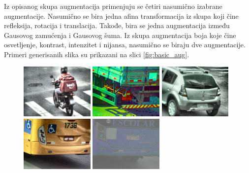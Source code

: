 \documentclass[12pt,oneside]{memoir}
\begin{document}
\noindent Iz opisanog skupa augmentacija primenjuju se četiri nasumično izabrane augmentacije. Nasumično se bira jedna afina transformacija iz skupa koji čine refleksija, rotacija i translacija. Takođe, bira se jedna augmentacija između Gausovog zamućenja i Gausovog šuma. Iz skupa augmentacija boja koje čine osvetljenje, kontrast, intenzitet i nijansa, nasumično se biraju dve augmentacije. Primeri generisanih slika su prikazani na slici \ref{fig:basic_aug}.

\begin{figure}[!htbp]
\centering
  \includegraphics[width=0.32\textwidth]{matfmaster/glava4/basic_aug/1.jpg}
  \includegraphics[width=0.32\textwidth]{matfmaster/glava4/basic_aug/2.jpg}
  \includegraphics[width=0.32\textwidth]{matfmaster/glava4/basic_aug/3.jpg}
  \includegraphics[width=0.32\textwidth]{matfmaster/glava4/basic_aug/4.jpg}  \includegraphics[width=0.32\textwidth]{matfmaster/glava4/basic_aug/5.jpg}

\end{figure}
\end{document}
